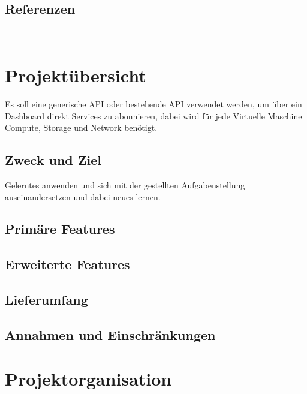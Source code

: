 \documentclass[11pt]{scrartcl}
\begin{document}
\subsection{Referenzen}
-
\section{Projektübersicht}
Es soll eine generische API oder bestehende API verwendet werden, um über ein 
Dashboard direkt Services zu abonnieren, dabei wird für jede Virtuelle Maschine 
Compute, Storage und Network benötigt.

\subsection{Zweck und Ziel}
 Gelerntes anwenden und sich mit der gestellten Aufgabenstellung auseinandersetzen 
 und dabei neues lernen.


\subsection{Primäre Features}

\subsection{Erweiterte Features}

\subsection{Lieferumfang}


\subsection{Annahmen und Einschränkungen}

\section{Projektorganisation}
\end{document}
